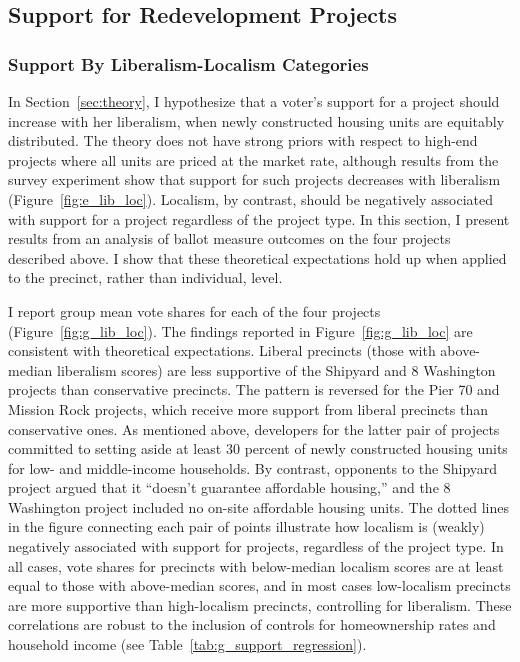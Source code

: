 \documentclass[article,11pt]{memoir}
\begin{document}
\subsection{Support for Redevelopment Projects}

\subsubsection{Support By Liberalism-Localism Categories}

In Section~\ref{sec:theory}, I hypothesize that a voter's support for a project should increase with her liberalism, when newly constructed housing units are equitably distributed. The theory does not have strong priors with respect to high-end projects where all units are priced at the market rate, although results from the survey experiment show that support for such projects decreases with liberalism (Figure~\ref{fig:e_lib_loc}).  Localism, by contrast, should be negatively associated with support for a project regardless of the project type.  In this section, I present results from an analysis of ballot measure outcomes on the four projects described above.  I show that these theoretical expectations hold up when applied to the precinct, rather than individual, level.

I report group mean vote shares for each of the four projects (Figure~\ref{fig:g_lib_loc}).  The findings reported in Figure~\ref{fig:g_lib_loc} are consistent with theoretical expectations.  Liberal precincts (those with above-median liberalism scores) are less supportive of the Shipyard and 8 Washington projects than conservative precincts.  The pattern is reversed for the Pier 70 and Mission Rock projects, which receive more support from liberal precincts than conservative ones.  As mentioned above, developers for the latter pair of projects committed to setting aside at least 30 percent of newly constructed housing units for low- and middle-income households.  By contrast, opponents to the Shipyard project argued that it ``doesn't guarantee affordable housing,'' and the 8 Washington project included no on-site affordable housing units.  The dotted lines in the figure connecting each pair of points illustrate how localism is (weakly) negatively associated with support for projects, regardless of the project type.  In all cases, vote shares for precincts with below-median localism scores are at least equal to those with above-median scores, and in most cases low-localism precincts are more supportive than high-localism precincts, controlling for liberalism.  These correlations are robust to the inclusion of controls for homeownership rates and household income (see Table~\ref{tab:g_support_regression}).
\end{document}
